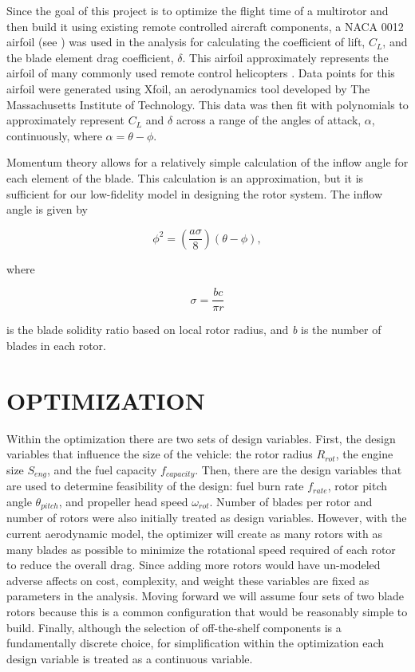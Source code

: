 \documentclass[letterpaper, 10 pt, conference]{ieeeconf}  %
\begin{document}
Since the goal of this project is to optimize the flight time of a multirotor and then build it using existing remote controlled aircraft components, a NACA 0012 airfoil (see \cite{abbott1959theory}) was used in the analysis for calculating the coefficient of lift, $C_L$, and the blade element drag coefficient, $\delta$. This airfoil approximately represents the airfoil of many commonly used remote control helicopters \cite{mettler2013identification}. Data points for this airfoil were generated using Xfoil, an aerodynamics tool developed by The Massachusetts Institute of Technology. This data was then fit with polynomials to approximately represent $C_L$ and $\delta$ across a range of the angles of attack, $\alpha$, continuously, where $\alpha = \theta - \phi$. 

Momentum theory allows for a relatively simple calculation of the inflow angle for each element of the blade. This calculation is an approximation, but it is sufficient for our low-fidelity model in designing the rotor system. The inflow angle is given by 

\begin{equation}
\phi^2 = (\frac{a\sigma}{8})(\theta-\phi),
\label{inflow_eqn}
\end{equation}

where 

\[ \sigma = \frac{bc}{\pi r} \]

is the blade solidity ratio based on local rotor radius, and \textit{b} is the number of blades in each rotor. 


\section{OPTIMIZATION}

Within the optimization there are two sets of design variables.  First, the design variables that influence the size of the vehicle: the rotor radius $R_{rot}$, the engine size $S_{eng}$, and the fuel capacity $f_{capacity}$.  Then, there are the design variables that are used to determine feasibility of the design: fuel burn rate $f_{rate}$, rotor pitch angle $\theta_{pitch}$, and propeller head speed $\omega_{rot}$. Number of blades per rotor and number of rotors were also initially treated as design variables. However, with the current aerodynamic model, the optimizer will create as many rotors with as many blades as possible to minimize the rotational speed required of each rotor to reduce the overall drag. Since adding more rotors would have un-modeled adverse affects on cost, complexity, and weight these variables are fixed as parameters in the analysis. Moving forward we will assume four sets of two blade rotors because this is a common configuration that would be reasonably simple to build. Finally, although the selection of off-the-shelf components is a fundamentally discrete choice, for simplification within the optimization each design variable is treated as a continuous variable. 
\end{document}
